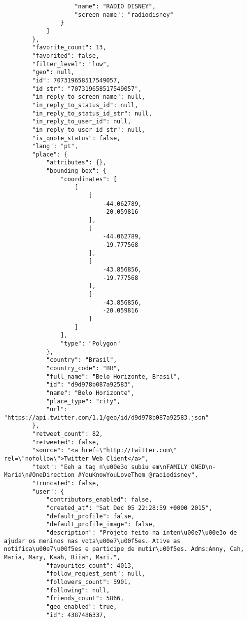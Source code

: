 \begin{lstlisting}
                    "name": "RADIO DISNEY",
                    "screen_name": "radiodisney"
                }
            ]
        },
        "favorite_count": 13,
        "favorited": false,
        "filter_level": "low",
        "geo": null,
        "id": 707319658517549057,
        "id_str": "707319658517549057",
        "in_reply_to_screen_name": null,
        "in_reply_to_status_id": null,
        "in_reply_to_status_id_str": null,
        "in_reply_to_user_id": null,
        "in_reply_to_user_id_str": null,
        "is_quote_status": false,
        "lang": "pt",
        "place": {
            "attributes": {},
            "bounding_box": {
                "coordinates": [
                    [
                        [
                            -44.062789,
                            -20.059816
                        ],
                        [
                            -44.062789,
                            -19.777568
                        ],
                        [
                            -43.856856,
                            -19.777568
                        ],
                        [
                            -43.856856,
                            -20.059816
                        ]
                    ]
                ],
                "type": "Polygon"
            },
            "country": "Brasil",
            "country_code": "BR",
            "full_name": "Belo Horizonte, Brasil",
            "id": "d9d978b087a92583",
            "name": "Belo Horizonte",
            "place_type": "city",
            "url": "https://api.twitter.com/1.1/geo/id/d9d978b087a92583.json"
        },
        "retweet_count": 82,
        "retweeted": false,
        "source": "<a href=\"http://twitter.com\" rel=\"nofollow\">Twitter Web Client</a>",
        "text": "Eeh a tag n\u00e3o subiu em\nFAMILY ONED\n- Maria\n#OneDirection #YouKnowYouLoveThem @radiodisney",
        "truncated": false,
        "user": {
            "contributors_enabled": false,
            "created_at": "Sat Dec 05 22:28:59 +0000 2015",
            "default_profile": false,
            "default_profile_image": false,
            "description": "Projeto feito na inten\u00e7\u00e3o de ajudar os meninos nas vota\u00e7\u00f5es. Ative as notifica\u00e7\u00f5es e participe de mutir\u00f5es. Adms:Anny, Cah, Maria, Mary, Kaah, Biiah, Mari.",
            "favourites_count": 4013,
            "follow_request_sent": null,
            "followers_count": 5901,
            "following": null,
            "friends_count": 5866,
            "geo_enabled": true,
            "id": 4387486337,

\end{lstlisting}
